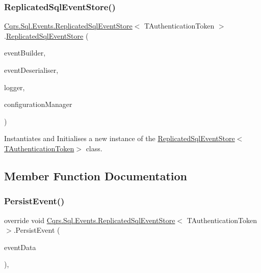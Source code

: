 \subsubsection{\texorpdfstring{Replicated\+Sql\+Event\+Store()}{ReplicatedSqlEventStore()}}
{\footnotesize\ttfamily \hyperlink{classCqrs_1_1Sql_1_1Events_1_1ReplicatedSqlEventStore}{Cqrs.\+Sql.\+Events.\+Replicated\+Sql\+Event\+Store}$<$ T\+Authentication\+Token $>$.\hyperlink{classCqrs_1_1Sql_1_1Events_1_1ReplicatedSqlEventStore}{Replicated\+Sql\+Event\+Store} (\begin{DoxyParamCaption}\item[{\hyperlink{interfaceCqrs_1_1Events_1_1IEventBuilder}{I\+Event\+Builder}$<$ T\+Authentication\+Token $>$}]{event\+Builder,  }\item[{\hyperlink{interfaceCqrs_1_1Events_1_1IEventDeserialiser}{I\+Event\+Deserialiser}$<$ T\+Authentication\+Token $>$}]{event\+Deserialiser,  }\item[{I\+Logger}]{logger,  }\item[{\hyperlink{interfaceCqrs_1_1Configuration_1_1IConfigurationManager}{I\+Configuration\+Manager}}]{configuration\+Manager }\end{DoxyParamCaption})}



Instantiates and Initialises a new instance of the \hyperlink{classCqrs_1_1Sql_1_1Events_1_1ReplicatedSqlEventStore_aa00d17e2b147ebf7d2aff5ef1a543c07_aa00d17e2b147ebf7d2aff5ef1a543c07}{Replicated\+Sql\+Event\+Store$<$\+T\+Authentication\+Token$>$} class. 



\subsection{Member Function Documentation}
\mbox{\label{classCqrs_1_1Sql_1_1Events_1_1ReplicatedSqlEventStore_a51c9b1329327e456a251aa2d910fc7ae_a51c9b1329327e456a251aa2d910fc7ae}} 
\subsubsection{\texorpdfstring{Persist\+Event()}{PersistEvent()}}
{\footnotesize\ttfamily override void \hyperlink{classCqrs_1_1Sql_1_1Events_1_1ReplicatedSqlEventStore}{Cqrs.\+Sql.\+Events.\+Replicated\+Sql\+Event\+Store}$<$ T\+Authentication\+Token $>$.Persist\+Event (\begin{DoxyParamCaption}\item[{\hyperlink{classCqrs_1_1Events_1_1EventData}{Event\+Data}}]{event\+Data }\end{DoxyParamCaption})\hspace{0.3cm}{\ttfamily [protected]}, {\ttfamily [virtual]}}



